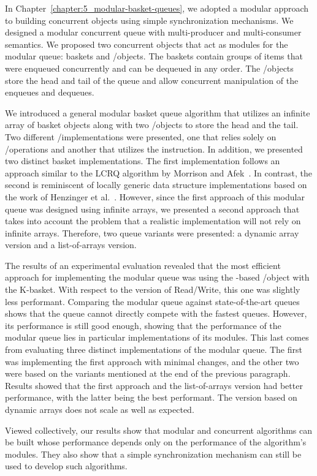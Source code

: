 In Chapter~\ref{chapter:5_modular-basket-queues}, we adopted a modular approach to building concurrent objects using simple synchronization mechanisms.
 We designed a modular concurrent queue with multi-producer and multi-consumer semantics. We proposed two concurrent objects that act as modules for the modular queue: baskets and \LL/\IC objects. The baskets contain groups of items that were enqueued concurrently and can be dequeued in any order. The \LL/\IC objects store the head and tail of the queue and allow concurrent manipulation of the enqueues and dequeues.

We introduced a general modular basket queue algorithm that utilizes an infinite array of basket objects along with two \LL/\IC objects to store the head and the tail. Two different \LL/\IC implementations were presented, one that relies solely on \R/\W operations and another that utilizes the \CAS instruction. In addition, we presented two distinct basket implementations. The first implementation follows an approach similar to the LCRQ algorithm by Morrison and Afek~\cite{ppopp2013x86queues}. In contrast, the second is reminiscent of locally generic data structure implementations based on the work of Henzinger et al.~\cite{DBLP_conf_concur_HaasHHKLPSSV16}. However, since the first approach of this modular queue was designed using infinite arrays, we presented a second approach that takes into account the problem that a realistic implementation will not rely on infinite arrays. Therefore, two queue variants were presented: a dynamic array version and a list-of-arrays version.

The results of an experimental evaluation revealed that the most efficient approach for implementing the modular queue was using the \CAS-based \LL/\IC object with the K-basket. With respect to the version of Read/Write, this one was slightly less performant. Comparing the modular queue against state-of-the-art queues shows that the queue cannot directly compete with the fastest queues. However, its performance is still good enough, showing that the performance of the modular queue lies in particular implementations of its modules. This last comes from evaluating three distinct implementations of the modular queue. The first was implementing the first approach with minimal changes, and the other two were based on the variants mentioned at the end of the previous paragraph. Results showed that the first approach and the list-of-arrays version had better performance, with the latter being the best performant. The version based on dynamic arrays does not scale as well as expected.

Viewed collectively, our results show that modular and concurrent algorithms can be built whose performance depends only on the performance of the algorithm's modules. They also show that a simple synchronization mechanism can still be used to develop such algorithms.

